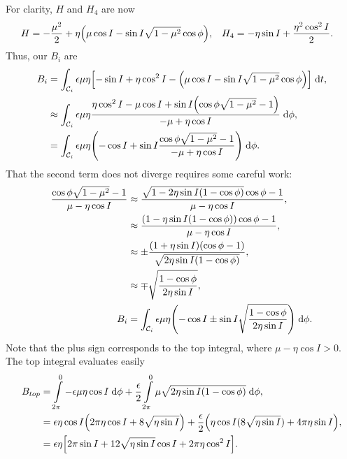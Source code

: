 \documentclass[11pt,
        usenames, %
        dvipsnames %
    ]{article}
\DeclarePairedDelimiter\p{\lparen}{\rparen}
\DeclarePairedDelimiter\s{\lbrack}{\rbrack}
\begin{document}
For clarity, $H$ and $H_4$ are now
\begin{align*}
    H &= -\frac{\mu^2}{2}
            + \eta\p*{\mu \cos I - \sin I \sqrt{1 - \mu^2}\cos \phi}, &
    H_4 &= -\eta \sin I + \frac{\eta^2 \cos^2 I}{2}.
\end{align*}
Thus, our $B_i$ are
\begin{align*}
    B_i &= \int_{\mathcal{C}_i} \epsilon \mu \eta
            \s*{-\sin I + \eta \cos^2 I -
                \p*{\mu \cos I - \sin I \sqrt{1 - \mu^2}\cos \phi}}
            \;\mathrm{d}t,\\
        &\approx \int_{\mathcal{C}_i} \epsilon \mu \eta
            \frac{\eta \cos^2 I - \mu \cos I
                + \sin I\p*{\cos \phi \sqrt{1 - \mu^2} - 1}}{-\mu + \eta \cos I}
            \;\mathrm{d}\phi,\\
        &= \int_{\mathcal{C}_i} \epsilon \mu \eta
            \p*{-\cos I + \sin I \frac{\cos \phi \sqrt{1 - \mu^2} - 1}{-\mu +
            \eta \cos I}} \;\mathrm{d}\phi.
\end{align*}
That the second term does not diverge requires some careful work:
\begin{align*}
    \frac{\cos \phi\sqrt{1 - \mu^2} - 1}{\mu - \eta \cos I}
        &\approx \frac{\sqrt{1 - 2\eta \sin I\p*{1 - \cos \phi}}\cos \phi
            - 1}{\mu - \eta \cos I},\\
        &\approx \frac{(1 - \eta \sin I(1 - \cos \phi))\cos \phi - 1}{
            \mu - \eta \cos I},\\
        &\approx \pm\frac{(1 + \eta \sin I)(\cos \phi - 1)}{\sqrt{2\eta \sin I
            (1 - \cos \phi)}},\\
        &\approx \mp\sqrt{\frac{1 - \cos \phi}{2\eta \sin I}},\\
    B_i &= \int_{\mathcal{C}_i} \epsilon \mu \eta
            \p*{-\cos I \pm \sin I
                \sqrt{\frac{1 - \cos \phi}{2\eta \sin I}}} \;\mathrm{d}\phi.
\end{align*}
Note that the plus sign corresponds to the top integral, where $\mu - \eta \cos
I > 0$. The top integral evaluates easily
\begin{align*}
    B_{top} &= \int\limits_{2\pi}^0 -\epsilon \mu \eta \cos I\;\mathrm{d}\phi
            + \frac{\epsilon}{2}\int\limits_{2\pi}^0
                \mu\sqrt{2\eta \sin I\p*{1 - \cos \phi}}\;\mathrm{d}\phi,\\
        &= \epsilon \eta \cos I\p*{2\pi \eta \cos I + 8\sqrt{\eta \sin I}}
            + \frac{\epsilon}{2}\p*{\eta \cos I (8\sqrt{\eta \sin I})
            + 4\pi \eta \sin I},\\
        &= \epsilon \eta \s*{
            2\pi \sin I + 12\sqrt{\eta \sin I}\cos I + 2\pi \eta \cos^2 I}.
\end{align*}
\end{document}
